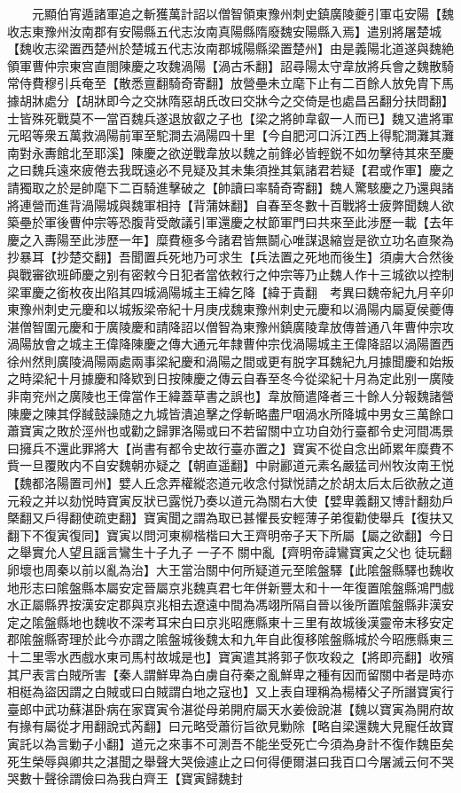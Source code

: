 　　元顯伯宵遁諸軍追之斬獲萬計詔以僧智領東豫州刺史鎮廣陵夔引軍屯安陽【魏收志東豫州汝南郡有安陽縣五代志汝南真陽縣隋廢魏安陽縣入焉】遣别將屠楚城【魏收志梁置西楚州於楚城五代志汝南郡城陽縣梁置楚州】由是義陽北道遂與魏絶　領軍曹仲宗東宫直閤陳慶之攻魏渦陽【渦古禾翻】詔尋陽太守韋放將兵會之魏散騎常侍費穆引兵奄至【散悉亶翻騎奇寄翻】放營壘未立麾下止有二百餘人放免胄下馬據胡牀處分【胡牀即今之交牀隋惡胡氏改曰交牀今之交倚是也處昌呂翻分扶問翻】士皆殊死戰莫不一當百魏兵遂退放叡之子也【梁之將帥韋叡一人而已】魏又遣將軍元昭等衆五萬救渦陽前軍至駝澗去渦陽四十里【今自肥河口泝江西上得駝澗灘其灘南對永夀館北至耶溪】陳慶之欲逆戰韋放以魏之前鋒必皆輕鋭不如勿擊待其來至慶之曰魏兵遠來疲倦去我既遠必不見疑及其未集須挫其氣諸君若疑【君或作軍】慶之請獨取之於是帥麾下二百騎進擊破之【帥讀曰率騎奇寄翻】魏人驚駭慶之乃還與諸將連營而進背渦陽城與魏軍相持【背蒲妹翻】自春至冬數十百戰將士疲弊聞魏人欲築壘於軍後曹仲宗等恐腹背受敵議引軍還慶之杖節軍門曰共來至此涉歷一載【去年慶之入夀陽至此涉歷一年】糜費極多今諸君皆無鬬心唯謀退縮豈是欲立功名直聚為抄暴耳【抄楚交翻】吾聞置兵死地乃可求生【兵法置之死地而後生】須虜大合然後與戰審欲班師慶之别有密敕今日犯者當依敕行之仲宗等乃止魏人作十三城欲以控制梁軍慶之銜枚夜出陷其四城渦陽城主王緯乞降【緯于貴翻　考異曰魏帝紀九月辛卯東豫州刺史元慶和以城叛梁帝紀十月庚戌魏東豫州刺史元慶和以渦陽内屬夏侯夔傳湛僧智圍元慶和于廣陵慶和請降詔以僧智為東豫州鎮廣陵韋放傳普通八年曹仲宗攻渦陽放會之城主王偉降陳慶之傳大通元年隸曹仲宗伐渦陽城主王偉降詔以渦陽置西徐州然則廣陵渦陽兩處兩事梁紀慶和渦陽之間或更有脱字耳魏紀九月據聞慶和始叛之時梁紀十月據慶和降欵到日按陳慶之傳云自春至冬今從梁紀十月為定此别一廣陵非南兖州之廣陵也王偉當作王緯蓋草書之誤也】韋放簡遣降者三十餘人分報魏諸營陳慶之陳其俘馘鼓譟随之九城皆潰追擊之俘斬略盡尸咽渦水所降城中男女三萬餘口　蕭寶寅之敗於涇州也或勸之歸罪洛陽或曰不若留關中立功自効行臺都令史河間馮景曰擁兵不還此罪將大【尚書有都令史故行臺亦置之】寶寅不從自念出師累年糜費不貲一旦覆敗内不自安魏朝亦疑之【朝直遥翻】中尉酈道元素名嚴猛司州牧汝南王悦【魏都洛陽置司州】嬖人丘念弄權縱恣道元收念付獄悦請之於胡太后太后欲赦之道元殺之并以劾悦時寶寅反狀已露悦乃奏以道元為關右大使【嬖卑義翻又博計翻劾戶槩翻又戶得翻使疏吏翻】寶寅聞之謂為取已甚懼長安輕薄子弟復勸使舉兵【復扶又翻下不復寅復同】寶寅以問河東柳楷楷曰大王齊明帝子天下所屬【屬之欲翻】今日之舉實允人望且謡言鸞生十子九子一子不關中亂【齊明帝諱鸞寶寅之父也徒玩翻卵壞也周秦以前以亂為治】大王當治關中何所疑道元至隂盤驛【此隂盤縣驛也魏收地形志曰隂盤縣本屬安定晉屬京兆魏真君七年併新豐太和十一年復置隂盤縣鴻門戲水正屬縣界按漢安定郡與京兆相去遼遠中間為馮翊所隔自晉以後所置隂盤縣非漢安定之隂盤縣地也魏收不深考耳宋白曰京兆昭應縣東十三里有故城後漢靈帝末移安定郡隂盤縣寄理於此今亦謂之隂盤城後魏太和九年自此復移隂盤縣城於今昭應縣東三十二里零水西戲水東司馬村故城是也】寶寅遣其將郭子恢攻殺之【將即亮翻】收殯其尸表言白賊所害【秦人謂鮮卑為白虜自苻秦之亂鮮卑之種有因而留關中者是時亦相梃為盜因謂之白賊或曰白賊謂白地之寇也】又上表自理稱為楊椿父子所譖寶寅行臺郎中武功蘇湛卧病在家寶寅令湛從母弟開府屬天水姜儉說湛【魏以寶寅為開府故有掾有屬從才用翻說式芮翻】曰元略受蕭衍旨欲見勦除【略自梁還魏大見寵任故寶寅託以為言勦子小翻】道元之來事不可測吾不能坐受死亡今須為身計不復作魏臣矣死生榮辱與卿共之湛聞之舉聲大哭儉遽止之曰何得便爾湛曰我百口今屠滅云何不哭哭數十聲徐謂儉曰為我白齊王【寶寅歸魏封